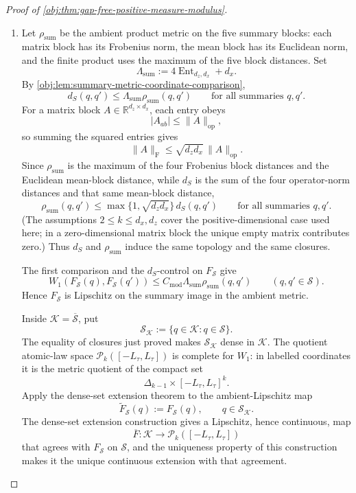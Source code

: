 \begin{proof}[Proof of \cref{obj:thm:gap-free-positive-measure-modulus}]
\begin{enumerate}
\item Let \(\rho_{\mathrm{sum}}\) be the ambient product metric on the five summary blocks: each matrix block has its Frobenius norm, the mean block has its Euclidean norm, and the finite product uses the maximum of the five block distances.  Set
\[
\Lambda_{\mathrm{sum}}:=4\operatorname{Ent}_{d_z,d_x}+d_x .
\]
By \cref{obj:lem:summary-metric-coordinate-comparison},
\[
d_S(q,q')
\le
\Lambda_{\mathrm{sum}}\rho_{\mathrm{sum}}(q,q')
\qquad\text{for all summaries }q,q'.
\]
For a matrix block \(A\in\mathbb R^{d_z\times d_x}\), each entry obeys
\[
|A_{ab}|\le\|A\|_{\mathrm{op}},
\]
so summing the squared entries gives
\[
\|A\|_{\mathrm F}\le\sqrt{d_zd_x}\,\|A\|_{\mathrm{op}}.
\]
Since \(\rho_{\mathrm{sum}}\) is the maximum of the four Frobenius block distances and the Euclidean mean-block distance, while \(d_S\) is the sum of the four operator-norm distances and that same mean-block distance,
\[
\rho_{\mathrm{sum}}(q,q')
\le
\max\{1,\sqrt{d_zd_x}\}\,d_S(q,q')
\qquad\text{for all summaries }q,q'.
\]
(The assumptions \(2\le k\le d_x,d_z\) cover the positive-dimensional case used here; in a zero-dimensional matrix block the unique empty matrix contributes zero.)  Thus \(d_S\) and \(\rho_{\mathrm{sum}}\) induce the same topology and the same closures.

The first comparison and the \(d_S\)-control on \(F_{\mathscr S}\) give
\[
W_1(F_{\mathscr S}(q),F_{\mathscr S}(q'))
\le
C_{\mathrm{mod}}\Lambda_{\mathrm{sum}}\rho_{\mathrm{sum}}(q,q')
\qquad(q,q'\in\mathscr S).
\]
Hence \(F_{\mathscr S}\) is Lipschitz on the summary image in the ambient metric.

Inside \(\mathcal K=\overline{\mathscr S}\), put
\[
\mathscr S_{\mathcal K}:=\{q\in\mathcal K:q\in\mathscr S\}.
\]
The equality of closures just proved makes \(\mathscr S_{\mathcal K}\) dense in \(\mathcal K\).  The quotient atomic-law space \(\mathcal P_k([-L_\tau,L_\tau])\) is complete for \(W_1\): in labelled coordinates it is the metric quotient of the compact set
\[
\Delta_{k-1}\times[-L_\tau,L_\tau]^k.
\]
Apply the dense-set extension theorem to the ambient-Lipschitz map
\[
\widetilde F_{\mathscr S}(q):=F_{\mathscr S}(q),
\qquad q\in\mathscr S_{\mathcal K}.
\]
The dense-set extension construction gives a Lipschitz, hence continuous, map
\[
\overline F:\mathcal K\to\mathcal P_k([-L_\tau,L_\tau])
\]
that agrees with \(F_{\mathscr S}\) on \(\mathscr S\), and the uniqueness property of this construction makes it the unique continuous extension with that agreement.


\end{enumerate}
\end{proof}
